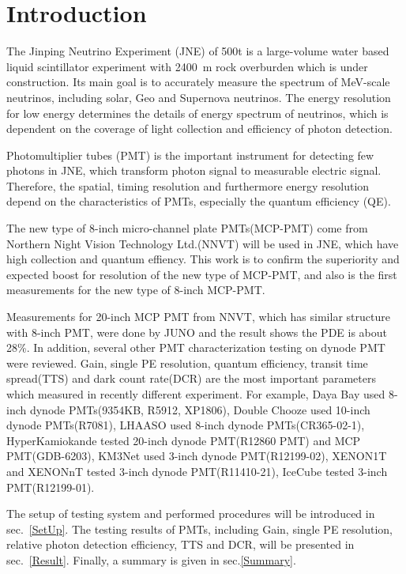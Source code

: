 \section{Introduction}
The Jinping Neutrino Experiment (JNE) of 500t is a large-volume water based liquid scintillator experiment with \SI{2400}{m} rock overburden\cite{LetterJNE2017} which is under construction. Its main goal is to accurately measure the spectrum of MeV-scale neutrinos, including solar, Geo and Supernova neutrinos\cite{LetterJNE2017}.  The energy resolution for low energy determines the details of energy spectrum of neutrinos, which is dependent on the coverage of light collection and efficiency of photon detection.

Photomultiplier tubes (PMT) is the important instrument for detecting few photons in JNE, which transform photon signal to measurable electric signal. Therefore, the spatial, timing resolution and furthermore energy resolution depend on the characteristics of PMTs, especially the quantum efficiency (QE). 

The new type of 8-inch micro-channel plate PMTs(MCP-PMT) come from Northern Night Vision Technology Ltd.(NNVT) will be used in JNE, which have high collection and quantum effiency. This work is to confirm the superiority and expected boost for resolution of the new type of MCP-PMT, and also is the first measurements for the new type of 8-inch MCP-PMT.

Measurements for 20-inch MCP PMT from NNVT, which has similar structure with 8-inch PMT, were done by JUNO and the result shows the PDE is about 28\%\cite{JUNOMassTesting}. In addition, several other PMT characterization testing on dynode PMT were reviewed. Gain, single PE resolution, quantum efficiency, transit time spread(TTS) and dark count rate(DCR) are the most important parameters which measured in recently different experiment. For example, Daya Bay used 8-inch dynode PMTs(9354KB, R5912, XP1806)\cite{DayaBayTesting}, Double Chooze used 10-inch dynode PMTs(R7081)\cite{DoubleChoozeTesting}, LHAASO used 8-inch dynode PMTs(CR365-02-1)\cite{LHAASOTesting}, HyperKamiokande tested 20-inch dynode PMT(R12860 PMT) and MCP PMT(GDB-6203)\cite{HyperKTesting}, KM3Net used 3-inch dynode PMT(R12199-02)\cite{KM3NetTesting}, XENON1T and XENONnT tested 3-inch dynode PMT(R11410-21)\cite{XENON1TTesting}\cite{XENONnTTesting}, IceCube tested 3-inch PMT(R12199-01)\cite{IceCubeTesting}.

The setup of testing system and performed procedures will be introduced in sec.~\ref{SetUp}. The testing results of PMTs, including Gain, single PE resolution, relative photon detection efficiency, TTS and DCR, will be presented in sec.~\ref{Result}. Finally, a summary is given in sec.\ref{Summary}.